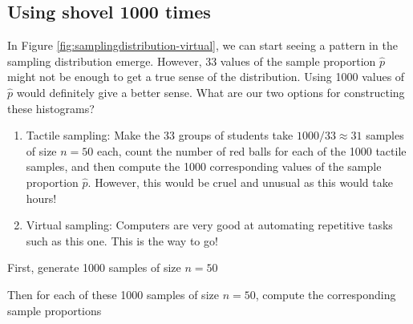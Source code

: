 \documentclass[12pt,]{krantz}
\makeatletter
\newenvironment{Shaded}{\begin{snugshade}}{\end{snugshade}}
\newcommand{\KeywordTok}[1]{\textcolor[rgb]{0.27,0.27,0.27}{\textbf{#1}}}
\newcommand{\DataTypeTok}[1]{\textcolor[rgb]{0.27,0.27,0.27}{#1}}
\newcommand{\DecValTok}[1]{\textcolor[rgb]{0.06,0.06,0.06}{#1}}
\newcommand{\StringTok}[1]{\textcolor[rgb]{0.5,0.5,0.5}{#1}}
\newcommand{\OperatorTok}[1]{\textcolor[rgb]{0.43,0.43,0.43}{\textbf{#1}}}
\newcommand{\NormalTok}[1]{#1}
\providecommand{\tightlist}{%
  \setlength{\itemsep}{0pt}\setlength{\parskip}{0pt}}
\newenvironment{kframe}{%
\medskip{}
\setlength{\fboxsep}{.8em}
 \def\at@end@of@kframe{}%
 \ifinner\ifhmode%
  \def\at@end@of@kframe{\end{minipage}}%
  \begin{minipage}{\columnwidth}%
 \fi\fi%
 \def\FrameCommand##1{\hskip\@totalleftmargin \hskip-\fboxsep
 \colorbox{shadecolor}{##1}\hskip-\fboxsep
     \hskip-\linewidth \hskip-\@totalleftmargin \hskip\columnwidth}%
 \MakeFramed {\advance\hsize-\width
   \@totalleftmargin\z@ \linewidth\hsize
   \@setminipage}}%
 {\par\unskip\endMakeFramed%
 \at@end@of@kframe}
\renewenvironment{Shaded}{\begin{kframe}}{\end{kframe}}
\theoremstyle{definition}
\theoremstyle{definition}
\theoremstyle{definition}
\theoremstyle{remark}
\makeatother
\begin{document}
\subsection{Using shovel 1000 times}\label{using-shovel-1000-times}

In Figure \ref{fig:samplingdistribution-virtual}, we can start seeing a
pattern in the sampling distribution emerge. However, 33 values of the
sample proportion \(\widehat{p}\) might not be enough to get a true
sense of the distribution. Using 1000 values of \(\widehat{p}\) would
definitely give a better sense. What are our two options for
constructing these histograms?

\begin{enumerate}
\def\labelenumi{\arabic{enumi}.}
\tightlist
\item
  Tactile sampling: Make the 33 groups of students take
  \(1000 / 33 \approx 31\) samples of size \(n=50\) each, count the
  number of red balls for each of the 1000 tactile samples, and then
  compute the 1000 corresponding values of the sample proportion
  \(\widehat{p}\). However, this would be cruel and unusual as this
  would take hours!
\item
  Virtual sampling: Computers are very good at automating repetitive
  tasks such as this one. This is the way to go!
\end{enumerate}

First, generate 1000 samples of size \(n=50\)

\begin{Shaded}
\end{Shaded}

Then for each of these 1000 samples of size \(n=50\), compute the
corresponding sample proportions

\begin{Shaded}
\end{Shaded}
\end{document}
